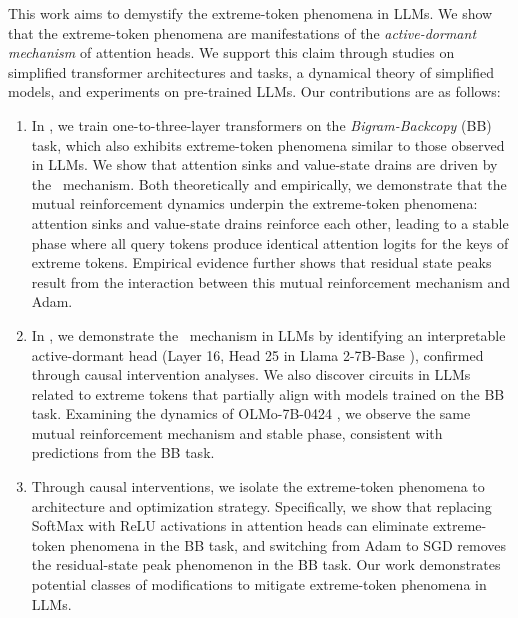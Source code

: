 This work aims to demystify the extreme-token phenomena in LLMs. We show that the extreme-token phenomena are manifestations of the \textit{active-dormant mechanism} of attention heads. We support this claim through studies on simplified transformer architectures and tasks, a dynamical theory of simplified models, and experiments on pre-trained LLMs. Our contributions are as follows: 
\begin{enumerate}[leftmargin=2em]
\setlength\itemsep{0pt}
\item In , we train one-to-three-layer transformers on the \textit{Bigram-Backcopy} (BB) task, which also exhibits extreme-token phenomena similar to those observed in LLMs. We show that attention sinks and value-state drains are driven by the \activedormant~mechanism. Both theoretically and empirically, we demonstrate that the mutual reinforcement dynamics underpin the extreme-token phenomena: attention sinks and value-state drains reinforce each other, leading to a stable phase where all query tokens produce identical attention logits for the keys of extreme tokens. Empirical evidence further shows that residual state peaks result from the interaction between this mutual reinforcement mechanism and Adam. 
\item In , we demonstrate the \textit{\activedormant}~mechanism in LLMs by identifying an interpretable active-dormant head (Layer 16, Head 25 in Llama 2-7B-Base \citep{touvron2023llama}), confirmed through causal intervention analyses. We also discover circuits in LLMs related to extreme tokens that partially align with models trained on the BB task. Examining the dynamics of OLMo-7B-0424 \citep{groeneveld2024olmo}, we observe the same mutual reinforcement mechanism and stable phase, consistent with predictions from the BB task. 
\item Through causal interventions, we isolate the extreme-token phenomena to architecture and optimization strategy. Specifically, we show that replacing SoftMax with ReLU activations in attention heads can eliminate extreme-token phenomena in the BB task, and switching from Adam to SGD removes the residual-state peak phenomenon in the BB task. Our work demonstrates potential classes of modifications to mitigate extreme-token phenomena in LLMs. %
\end{enumerate}

